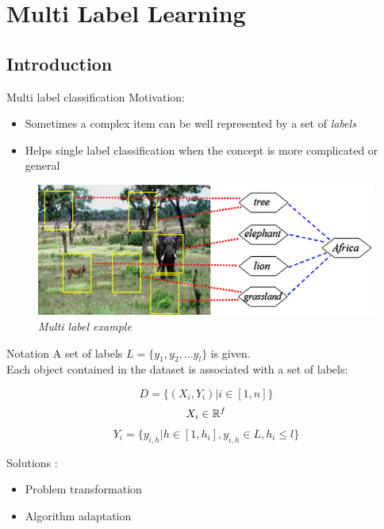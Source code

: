  \section{Multi Label Learning}
 
\subsection*{Introduction}
\begin{frame}{Multi label classification}
	Motivation:
	\begin{itemize}\setlength\itemsep{1em}
		\item Sometimes a complex item can be well represented by a set of \textit{labels}
		\item Helps single label classification when the concept is more complicated or general
	\end{itemize}
	\begin{figure}[htbp]
		\centering
		\includegraphics[scale = 0.3]{./images/ml1.png}
		\caption{\textit{Multi label example}}
	\end{figure}
\end{frame}

\begin{frame}{Notation}
	A set of labels $L = \{y_1, y_2,... y_l\}$ is given.\\
	Each object contained in the dataset is associated with a set of labels:
	
	$$D = \{(X_i, Y_i) | i \in [1, n]\}$$
	$$X_i \in \mathbb{R}^f$$
	$$Y_i = \{y_{i,h} | h \in [1, h_i], y_{i,h} \in L, h_i \leq l\}$$
		
	Solutions \cite{ml_approaches}:
	\begin{itemize}\setlength\itemsep{1em}
		\item Problem transformation
		\item Algorithm adaptation
	\end{itemize}
	
\end{frame}

